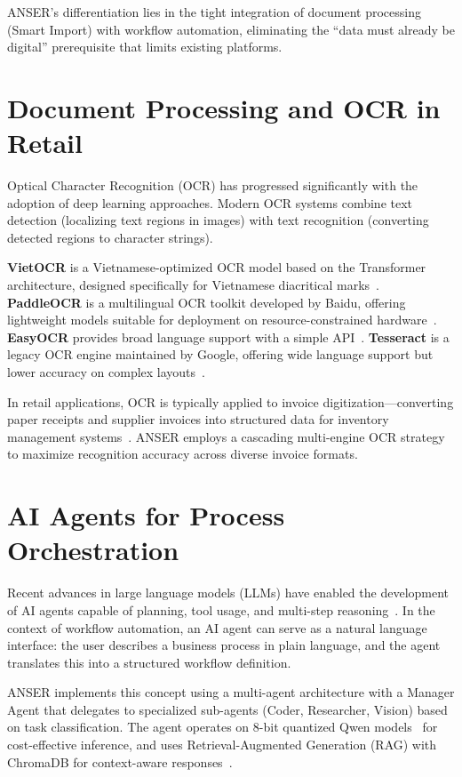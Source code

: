 \documentclass[11pt,a4paper]{report}
\begin{document}
ANSER's differentiation lies in the tight integration of document processing (Smart Import) with workflow automation, eliminating the ``data must already be digital'' prerequisite that limits existing platforms.

\section{Document Processing and OCR in Retail}

Optical Character Recognition (OCR) has progressed significantly with the adoption of deep learning approaches. Modern OCR systems combine text detection (localizing text regions in images) with text recognition (converting detected regions to character strings).

\textbf{VietOCR} is a Vietnamese-optimized OCR model based on the Transformer architecture, designed specifically for Vietnamese diacritical marks~\cite{vietocr}. \textbf{PaddleOCR} is a multilingual OCR toolkit developed by Baidu, offering lightweight models suitable for deployment on resource-constrained hardware~\cite{paddleocr}. \textbf{EasyOCR} provides broad language support with a simple API~\cite{easyocr}. \textbf{Tesseract} is a legacy OCR engine maintained by Google, offering wide language support but lower accuracy on complex layouts~\cite{tesseract}.

In retail applications, OCR is typically applied to invoice digitization---converting paper receipts and supplier invoices into structured data for inventory management systems~\cite{baviskar2021}. ANSER employs a cascading multi-engine OCR strategy to maximize recognition accuracy across diverse invoice formats.

\section{AI Agents for Process Orchestration}

Recent advances in large language models (LLMs) have enabled the development of AI agents capable of planning, tool usage, and multi-step reasoning~\cite{yao2023react}. In the context of workflow automation, an AI agent can serve as a natural language interface: the user describes a business process in plain language, and the agent translates this into a structured workflow definition.

ANSER implements this concept using a multi-agent architecture with a Manager Agent that delegates to specialized sub-agents (Coder, Researcher, Vision) based on task classification. The agent operates on 8-bit quantized Qwen models~\cite{qwen2vl} for cost-effective inference, and uses Retrieval-Augmented Generation (RAG) with ChromaDB for context-aware responses~\cite{chromadb}.
\end{document}
